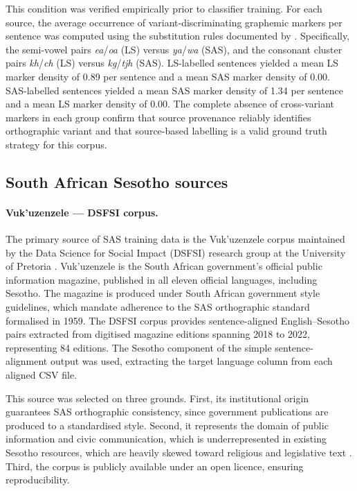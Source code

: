 \documentclass[12pt]{ThesisRU}
\begin{document}
This condition was verified empirically prior to classifier training. For each
source, the average occurrence of variant-discriminating graphemic markers
per sentence was computed using the substitution rules documented by
\citet{makutoane2022people}. Specifically, the semi-vowel pairs
\textit{ea}/\textit{oa} (LS) versus \textit{ya}/\textit{wa} (SAS), and
the consonant cluster pairs \textit{kh}/\textit{ch} (LS) versus
\textit{kg}/\textit{tjh} (SAS). LS-labelled sentences yielded a mean LS
marker density of 0.89 per sentence and a mean SAS marker density of 0.00.
SAS-labelled sentences yielded a mean SAS marker density of 1.34 per sentence
and a mean LS marker density of 0.00. The complete absence of cross-variant
markers in each group confirm that source provenance reliably identifies
orthographic variant and that source-based labelling is a valid ground truth
strategy for this corpus.

\subsection{South African Sesotho sources}

\paragraph{Vuk'uzenzele — DSFSI corpus.}
The primary source of SAS training data is the Vuk'uzenzele corpus maintained
by the Data Science for Social Impact (DSFSI) research group at the University
of Pretoria \citep{marivate2020investigating}. Vuk'uzenzele is the South African
government's official public information magazine, published in all eleven
official languages, including Sesotho. The magazine is produced under South
African government style guidelines, which mandate adherence to the SAS
orthographic standard formalised in 1959. The DSFSI corpus provides
sentence-aligned English--Sesotho pairs extracted from digitised magazine
editions spanning 2018 to 2022, representing 84 editions. The Sesotho component
of the simple sentence-alignment output was used, extracting the target language
column from each aligned CSV file.

This source was selected on three grounds. First, its institutional origin
guarantees SAS orthographic consistency, since government publications are
produced to a standardised style. Second, it represents the domain of public
information and civic communication, which is underrepresented in existing
Sesotho resources, which are heavily skewed toward religious and legislative
text \citep{kwon2026afroscope}. Third, the corpus is publicly available under an
open licence, ensuring reproducibility.
\end{document}
